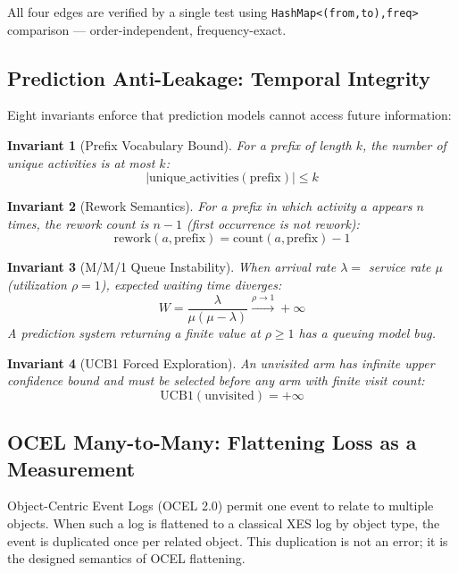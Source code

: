 \documentclass[12pt,a4paper]{article}
\newtheorem{invariant}{Invariant}
\begin{document}
All four edges are verified by a single test using \texttt{HashMap\textless(from,to),freq\textgreater}
comparison --- order-independent, frequency-exact.

\subsection{Prediction Anti-Leakage: Temporal Integrity}

Eight invariants enforce that prediction models cannot access future information:

\begin{invariant}[Prefix Vocabulary Bound]
  For a prefix of length $k$, the number of unique activities is at most $k$:
  \[ |\text{unique\_activities}(\text{prefix})| \le k \]
\end{invariant}

\begin{invariant}[Rework Semantics]
  For a prefix in which activity $a$ appears $n$ times, the rework count is $n - 1$
  (first occurrence is not rework):
  \[ \text{rework}(a, \text{prefix}) = \text{count}(a, \text{prefix}) - 1 \]
\end{invariant}

\begin{invariant}[M/M/1 Queue Instability]
  When arrival rate $\lambda = $ service rate $\mu$ (utilization $\rho = 1$),
  expected waiting time diverges:
  \[ W = \frac{\lambda}{\mu(\mu - \lambda)} \xrightarrow{\rho \to 1} +\infty \]
  A prediction system returning a finite value at $\rho \ge 1$ has a queuing model bug.
\end{invariant}

\begin{invariant}[UCB1 Forced Exploration]
  An unvisited arm has infinite upper confidence bound and must be selected before
  any arm with finite visit count:
  \[ \text{UCB1}(\text{unvisited}) = +\infty \]
\end{invariant}

\subsection{OCEL Many-to-Many: Flattening Loss as a Measurement}

Object-Centric Event Logs (OCEL 2.0) permit one event to relate to multiple
objects. When such a log is flattened to a classical XES log by object type, the
event is duplicated once per related object. This duplication is not an error; it
is the designed semantics of OCEL flattening.
\end{document}
